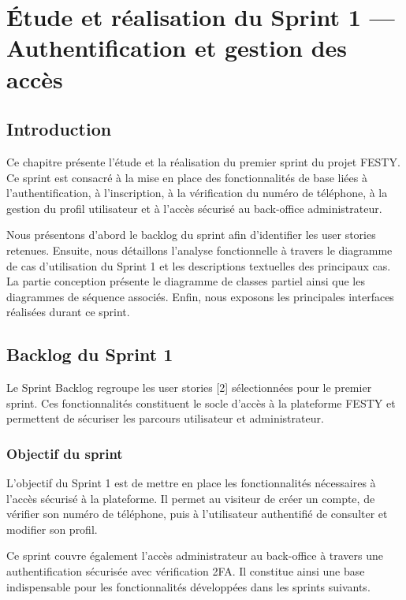﻿%

\chapter{Étude et réalisation du Sprint 1 — Authentification et gestion des accès}
\label{chap:sprint1-authentification-acces}


\section{Introduction}


Ce chapitre présente l’étude et la réalisation du premier sprint du projet FESTY. Ce sprint est consacré à la mise en place des fonctionnalités de base liées à l’authentification, à l’inscription, à la vérification du numéro de téléphone, à la gestion du profil utilisateur et à l’accès sécurisé au back-office administrateur.


Nous présentons d’abord le backlog du sprint afin d’identifier les user stories retenues. Ensuite, nous détaillons l’analyse fonctionnelle à travers le diagramme de cas d’utilisation du Sprint 1 et les descriptions textuelles des principaux cas. La partie conception présente le diagramme de classes partiel ainsi que les diagrammes de séquence associés. Enfin, nous exposons les principales interfaces réalisées durant ce sprint.


\section{Backlog du Sprint 1}


Le Sprint Backlog regroupe les user stories [2] sélectionnées pour le premier sprint. Ces fonctionnalités constituent le socle d’accès à la plateforme FESTY et permettent de sécuriser les parcours utilisateur et administrateur.


\subsection{Objectif du sprint}


L’objectif du Sprint 1 est de mettre en place les fonctionnalités nécessaires à l’accès sécurisé à la plateforme. Il permet au visiteur de créer un compte, de vérifier son numéro de téléphone, puis à l’utilisateur authentifié de consulter et modifier son profil.


Ce sprint couvre également l’accès administrateur au back-office à travers une authentification sécurisée avec vérification 2FA. Il constitue ainsi une base indispensable pour les fonctionnalités développées dans les sprints suivants.


